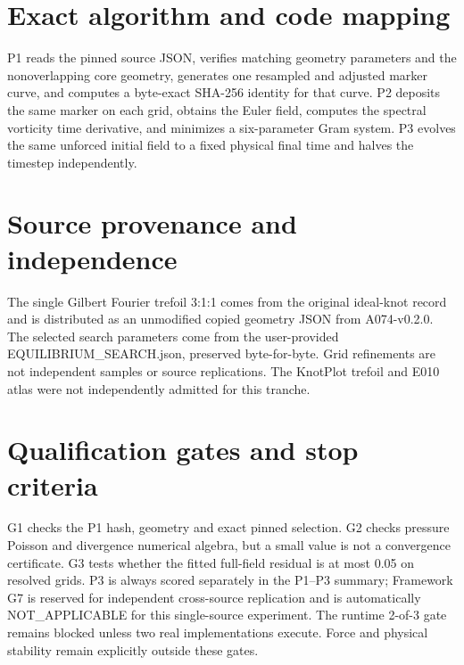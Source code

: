 \documentclass[11pt,a4paper]{article}
\begin{document}

\section{Exact algorithm and code mapping}

P1 reads the pinned source JSON, verifies matching geometry parameters and the nonoverlapping core geometry, generates one resampled and adjusted marker curve, and computes a byte-exact SHA-256 identity for that curve. P2 deposits the same marker on each grid, obtains the Euler field, computes the spectral vorticity time derivative, and minimizes a six-parameter Gram system. P3 evolves the same unforced initial field to a fixed physical final time and halves the timestep independently.


\section{Source provenance and independence}

The single Gilbert Fourier trefoil 3:1:1 comes from the original ideal-knot record and is distributed as an unmodified copied geometry JSON from A074-v0.2.0. The selected search parameters come from the user-provided EQUILIBRIUM\_SEARCH.json, preserved byte-for-byte. Grid refinements are not independent samples or source replications. The KnotPlot trefoil and E010 atlas were not independently admitted for this tranche.


\section{Qualification gates and stop criteria}

G1 checks the P1 hash, geometry and exact pinned selection. G2 checks pressure Poisson and divergence numerical algebra, but a small value is not a convergence certificate. G3 tests whether the fitted full-field residual is at most 0.05 on resolved grids. P3 is always scored separately in the P1--P3 summary; Framework G7 is reserved for independent cross-source replication and is automatically NOT\_APPLICABLE for this single-source experiment. The runtime 2-of-3 gate remains blocked unless two real implementations execute. Force and physical stability remain explicitly outside these gates.

\end{document}
